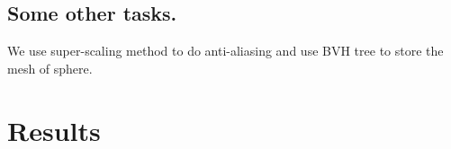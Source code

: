 \documentclass[acmtog]{acmart}
\begin{document}
	\subsection{Some other tasks.}
	We use super-scaling method to do anti-aliasing and use BVH tree to store the mesh of sphere.
	\section{Results}
	\begin{figure}[ht]\centering 
		\\
		\label{Figure1}
	\end{figure}
	\begin{figure}[ht]\centering 
		\\
		\label{Figure1}
	\end{figure}

	
\end{document}
